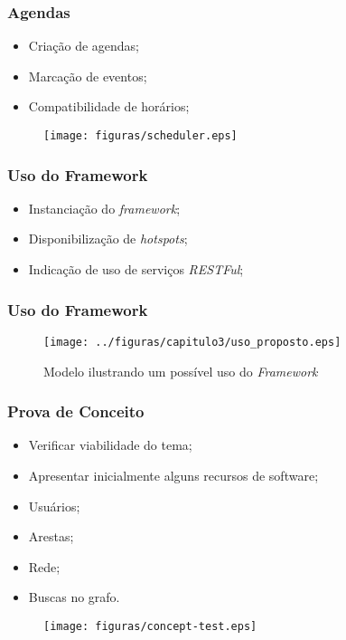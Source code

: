 \documentclass{beamer}
\begin{document}
\begin{frame}
\frametitle{Agendas}

\begin{itemize}
	\item Criação de agendas;
	\item Marcação de eventos;
	\item Compatibilidade de horários;
\end{itemize}

\begin{figure}[h]
	\centering
	\texttt{[image: figuras/scheduler.eps]}
\end{figure}

\end{frame}

\begin{frame}
\frametitle{Uso do Framework}

\begin{itemize}
	\item Instanciação do \textit{framework};
	\item Disponibilização de \textit{hotspots};
	\item Indicação de uso de serviços \textit{RESTFul};
\end{itemize}

\end{frame}

\begin{frame}
\frametitle{Uso do Framework}

\begin{figure}[!h]
	\centering
	\texttt{[image: ../figuras/capitulo3/uso\_proposto.eps]}
	\caption{Modelo ilustrando um possível uso do \textit{Framework}}
	\label{uso_proposto}
\end{figure}

\end{frame}

\begin{frame}
\frametitle{Prova de Conceito}

\begin{itemize}
	\item Verificar viabilidade do tema;
	\item Apresentar inicialmente alguns recursos de software;
	\item Usuários;
	\item Arestas;
	\item Rede;
	\item Buscas no grafo.
\end{itemize}

\begin{figure}[h]
	\centering
	\texttt{[image: figuras/concept-test.eps]}
\end{figure}

\end{frame}
\end{document}
